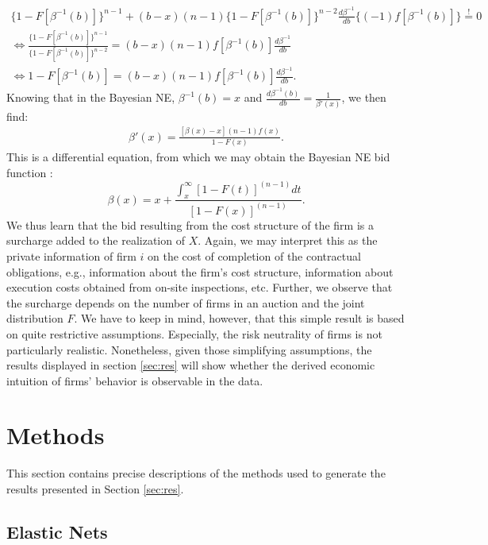 \documentclass[a4paper,12pt, headsepline]{scrartcl}
\numberwithin{equation}{section}
\begin{document}
\begin{gather*}
\{1-F[\beta^{-1}(b)]\}^{n-1} + (b - x)(n - 		1)\{1-F[\beta^{-1}(b)]\}^{n-2}\frac{d\beta^{-1}}{db}\{(-1)f[\beta^{-1}(b)]\} \overset{!}{=} 0\\
	\iff \frac{\{1-F[\beta^{-1}(b)]\}^{n-1}}{\{1-F[\beta^{-1}(b)]\}^{n-2}} = (b - x)(n - 1)f[\beta^{-1}(b)]\frac{d\beta^{-1}}{db}\\
	\iff 1-F[\beta^{-1}(b)] = (b - x)(n - 1)f[\beta^{-1}(b)]\frac{d\beta^{-1}}{db}.
\end{gather*}
Knowing that in the Bayesian NE, $\beta^{-1}(b) = x$ and $\frac{d\beta^{-1}(b)}{db} = \frac{1}{\beta'(x)}$, we then find:
\begin{gather*}
	\beta'(x) = \frac{[\beta(x) - x](n - 1)f(x)}{1-F(x)}.
\end{gather*}
This is a differential equation, from which we may obtain the Bayesian NE bid function \citep{decarolis18}:
\[
\beta(x) = x + \frac{\int_x^\infty [1 - F(t)]^{(n-1)}dt}{[1-F(x)]^{(n-1)}}.
\]
We thus learn that the bid resulting from the cost structure of the firm is a surcharge added to the realization of $X$. Again, we may interpret this as the private information of firm $i$ on the cost of completion of the contractual obligations, e.g., information about the firm's cost structure, information about execution costs obtained from on-site inspections, etc. Further, we observe that the surcharge depends on the number of firms in an auction and the joint distribution $F$. We have to keep in mind, however, that this simple result is based on quite restrictive assumptions. Especially, the risk neutrality of firms is not particularly realistic. Nonetheless, given those simplifying assumptions, the results displayed in section \ref{sec:res} will show whether the derived economic intuition of firms' behavior is observable in the data.
\newpage
\section{Methods}\label{sec:meth}

This section contains precise descriptions of the methods used to generate the results presented in Section \ref{sec:res}.

\subsection{Elastic Nets}\label{subsec:net}
\end{document}
